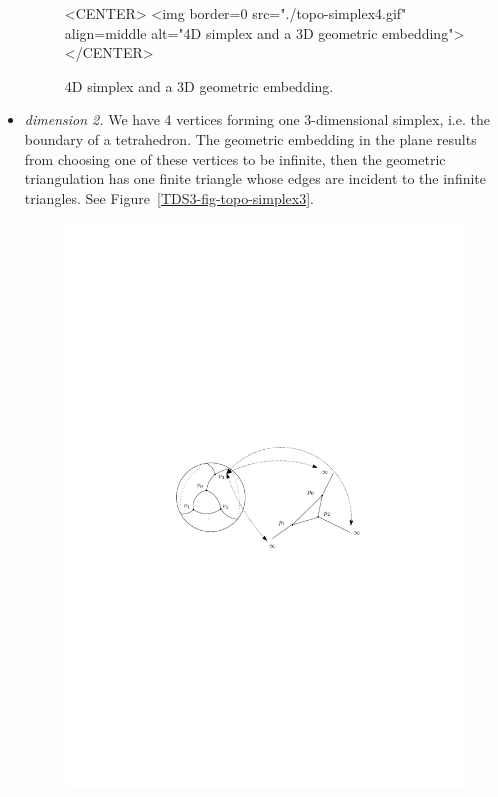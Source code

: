 \begin{itemize}
\begin{figure}
\begin{ccTexOnly}
\begin{center}
\end{center}
\end{ccTexOnly}
\begin{ccHtmlOnly}
<CENTER>
<img border=0 src="./topo-simplex4.gif" align=middle
alt="4D simplex and a 3D geometric embedding">
</CENTER>
\end{ccHtmlOnly}
\caption{4D simplex and a 3D geometric embedding.
\label{TDS3-fig-topo-simplex4}}
\end{figure} 
\item \emph{dimension 2.} We have 4 vertices forming one 3-dimensional
simplex, i.e. the boundary of a tetrahedron. The geometric embedding in
the plane results from choosing one of these vertices to be infinite,
then the geometric triangulation has one finite triangle whose edges are
incident to the infinite triangles. See Figure~\ref{TDS3-fig-topo-simplex3}.
\begin{figure}
\begin{ccTexOnly}
\begin{center} 
\includegraphics{TriangulationDS_3/topo-simplex3}

\end{center}
\end{ccTexOnly}
\end{figure}
\end{itemize}
